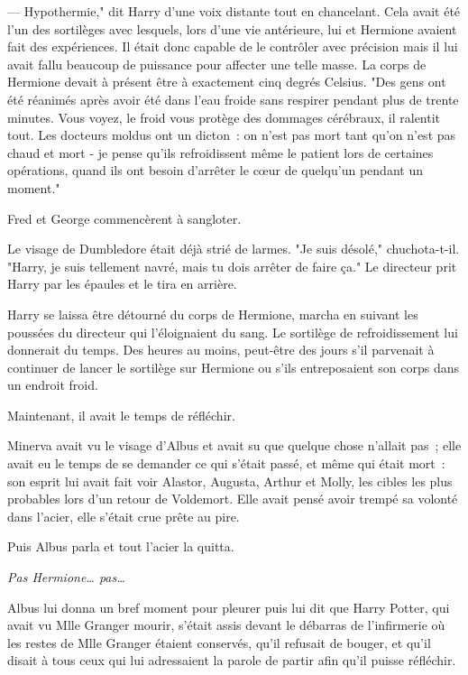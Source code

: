 --- Hypothermie," dit Harry d'une voix distante tout en chancelant. Cela avait été l'un des sortilèges avec lesquels, lors d'une vie antérieure, lui et Hermione avaient fait des expériences. Il était donc capable de le contrôler avec précision mais il lui avait fallu beaucoup de puissance pour affecter une telle masse. La corps de Hermione devait à présent être à exactement cinq degrés Celsius. "Des gens ont été réanimés après avoir été dans l'eau froide sans respirer pendant plus de trente minutes. Vous voyez, le froid vous protège des dommages cérébraux, il ralentit tout. Les docteurs moldus ont un dicton~: on n'est pas mort tant qu'on n'est pas chaud et mort - je pense qu'ils refroidissent même le patient lors de certaines opérations, quand ils ont besoin d'arrêter le cœur de quelqu'un pendant un moment."

Fred et George commencèrent à sangloter.

Le visage de Dumbledore était déjà strié de larmes. "Je suis désolé," chuchota-t-il. "Harry, je suis tellement navré, mais tu dois arrêter de faire ça." Le directeur prit Harry par les épaules et le tira en arrière.

Harry se laissa être détourné du corps de Hermione, marcha en suivant les poussées du directeur qui l'éloignaient du sang. Le sortilège de refroidissement lui donnerait du temps. Des heures au moins, peut-être des jours s'il parvenait à continuer de lancer le sortilège sur Hermione ou s'ils entreposaient son corps dans un endroit froid.

Maintenant, il avait le temps de réfléchir.

\later

Minerva avait vu le visage d'Albus et avait su que quelque chose n'allait pas~; elle avait eu le temps de se demander ce qui s'était passé, et même qui était mort~: son esprit lui avait fait voir Alastor, Augusta, Arthur et Molly, les cibles les plus probables lors d'un retour de Voldemort. Elle avait pensé avoir trempé sa volonté dans l'acier, elle s'était crue prête au pire.

Puis Albus parla et tout l'acier la quitta.

\emph{Pas Hermione… pas…}

Albus lui donna un bref moment pour pleurer puis lui dit que Harry Potter, qui avait vu Mlle Granger mourir, s'était assis devant le débarras de l'infirmerie où les restes de Mlle Granger étaient conservés, qu'il refusait de bouger, et qu'il disait à tous ceux qui lui adressaient la parole de partir afin qu'il puisse réfléchir.

